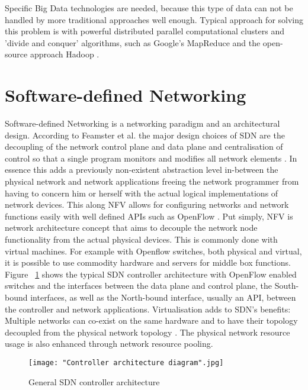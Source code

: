 \documentclass{acm_proc_article-sp}
\begin{document}
Specific Big Data technologies are needed, because this type of data can not be handled by more traditional approaches well enough. Typical approach for solving this problem is with powerful distributed parallel computational clusters and 'divide and conquer' algorithms, such as Google's MapReduce \cite{Dean:2008:MSD:1327452.1327492} and the open-source approach Hadoop \cite{Hadoop}.

\section{Software-defined Networking}

Software-defined Networking is a networking paradigm and an architectural design. According to Feamster et al. the major design choices of SDN are the decoupling of the network control plane and data plane and centralisation of control so that a single program monitors and modifies all network elements \cite{Feamster:2013:RS:2559899.2560327}. In essence this adds a previously non-existent abstraction level in-between the physical network and network applications freeing the network programmer from having to concern him or herself with the actual logical implementations of network devices. This along NFV allows for configuring networks and network functions easily with well defined APIs such as OpenFlow \cite{McKeown-CCR2008}. Put simply, NFV is network architecture concept that aims to decouple the network node functionality from the actual physical devices. This is commonly done with virtual machines. For example with Openflow switches, both physical and virtual, it is possible to use commodity hardware and servers for middle box functions. Figure ~\ref{fig:architecture} shows the typical SDN controller architecture with OpenFlow enabled switches and the interfaces between the data plane and control plane, the South-bound interfaces, as well as the North-bound interface, usually an API, between the controller and network applications. Virtualisation adds to SDN's benefits: Multiple networks can co-exist on the same hardware and to have their topology decoupled from the physical network topology \cite{Azodolmolky}. The physical network resource usage is also enhanced through network resource pooling. 

\begin{figure}[ht!]
\centering
{}
\texttt{[image: "Controller architecture diagram".jpg]}
\caption{General SDN controller architecture}
\label{fig:architecture}
\end{figure} 
\end{document}
